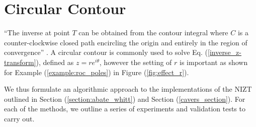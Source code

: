 \documentclass[a4paper]{report}
\begin{document}
\section{Circular Contour}
``The inverse at point $T$ can be obtained from the contour integral where $C$ is a counter-clockwise closed path encircling the origin and entirely in the region of convergence'' \citep{horvath2020numerical}. A circular contour is commonly used to solve Eq. (\ref{inverse_z-transform}), defined as $z = re^{i\theta}$, however the setting of $r$ is important as shown for Example (\ref{example:roc_poles}) in Figure (\ref{fig:effect_r}).

We thus formulate an algorithmic approach to the implementations of the NIZT outlined in Section (\ref{section:abate_whitt}) and Section (\ref{cavers_section}). For each of the methods, we outline a series of experiments and validation tests to carry out.
\end{document}
